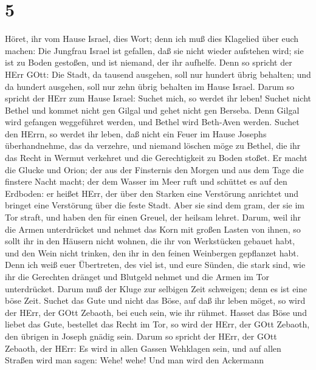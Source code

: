 \hypertarget{section-4}{%
\section{5}\label{section-4}}

 Höret, ihr vom Hause Israel, dies Wort; denn ich muß dies
Klagelied über euch machen:  Die Jungfrau Israel ist
gefallen, daß sie nicht wieder aufstehen wird; sie ist zu Boden
gestoßen, und ist niemand, der ihr aufhelfe.  Denn so
spricht der HErr GOtt: Die Stadt, da tausend ausgehen, soll nur hundert
übrig behalten; und da hundert ausgehen, soll nur zehn übrig behalten im
Hause Israel.  Darum so spricht der HErr zum Hause Israel:
Suchet mich, so werdet ihr leben!  Suchet nicht Bethel und
kommet nicht gen Gilgal und gehet nicht gen Berseba. Denn Gilgal wird
gefangen weggeführet werden, und Bethel wird Beth-Aven werden.
 Suchet den HErrn, so werdet ihr leben, daß nicht ein Feuer
im Hause Josephs überhandnehme, das da verzehre, und niemand löschen
möge zu Bethel,  die ihr das Recht in Wermut verkehret und
die Gerechtigkeit zu Boden stoßet.  Er macht die Glucke und
Orion; der aus der Finsternis den Morgen und aus dem Tage die finstere
Nacht macht; der dem Wasser im Meer ruft und schüttet es auf den
Erdboden: er heißet HErr,  der über den Starken eine
Verstörung anrichtet und bringet eine Verstörung über die feste Stadt.
 Aber sie sind dem gram, der sie im Tor straft, und haben
den für einen Greuel, der heilsam lehret.  Darum, weil ihr
die Armen unterdrücket und nehmet das Korn mit großen Lasten von ihnen,
so sollt ihr in den Häusern nicht wohnen, die ihr von Werkstücken
gebauet habt, und den Wein nicht trinken, den ihr in den feinen
Weinbergen gepflanzet habt.  Denn ich weiß euer Übertreten,
des viel ist, und eure Sünden, die stark sind, wie ihr die Gerechten
dränget und Blutgeld nehmet und die Armen im Tor unterdrücket.
 Darum muß der Kluge zur selbigen Zeit schweigen; denn es
ist eine böse Zeit.  Suchet das Gute und nicht das Böse,
auf daß ihr leben möget, so wird der HErr, der GOtt Zebaoth, bei euch
sein, wie ihr rühmet.  Hasset das Böse und liebet das Gute,
bestellet das Recht im Tor, so wird der HErr, der GOtt Zebaoth, den
übrigen in Joseph gnädig sein.  Darum so spricht der HErr,
der GOtt Zebaoth, der HErr: Es wird in allen Gassen Wehklagen sein, und
auf allen Straßen wird man sagen: Wehe! wehe! Und man wird den Ackermann
